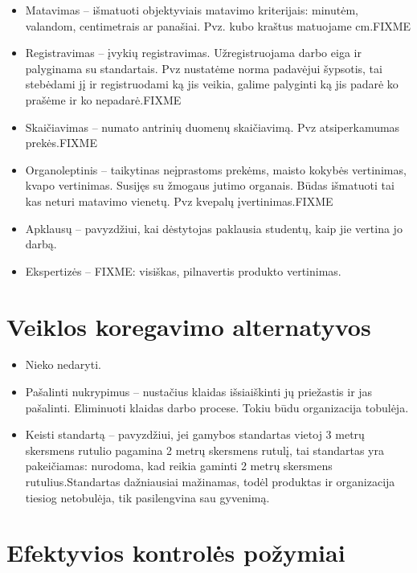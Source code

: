 \begin{itemize}
  \item Matavimas – išmatuoti objektyviais matavimo kriterijais: minutėm, valandom, centimetrais ar panašiai. Pvz. kubo kraštus matuojame cm.FIXME
  \item Registravimas – įvykių registravimas. Užregistruojama darbo eiga ir palyginama su standartais. Pvz nustatėme norma padavėjui šypsotis, tai stebėdami jį ir registruodami ką jis veikia, galime palyginti ką jis padarė ko prašėme ir ko nepadarė.FIXME
  \item Skaičiavimas –  numato antrinių duomenų skaičiavimą. Pvz atsiperkamumas prekės.FIXME
  \item Organoleptinis – taikytinas neįprastoms prekėms, maisto kokybės vertinimas, kvapo vertinimas. Susijęs su žmogaus jutimo organais. Būdas išmatuoti tai kas neturi matavimo vienetų. Pvz kvepalų įvertinimas.FIXME
  \item Apklausų – pavyzdžiui, kai dėstytojas paklausia studentų, kaip
    jie vertina jo darbą.
  \item Ekspertizės – FIXME: visiškas, pilnavertis produkto vertinimas.
\end{itemize}

\section{Veiklos koregavimo alternatyvos}

\begin{itemize}
  \item Nieko nedaryti.
  \item Pašalinti nukrypimus – nustačius klaidas išsiaiškinti jų priežastis
    ir jas pašalinti. Eliminuoti klaidas darbo procese. Tokiu būdu organizacija tobulėja. 
  \item Keisti standartą – pavyzdžiui, jei gamybos standartas vietoj
    3 metrų skersmens rutulio pagamina 2 metrų skersmens rutulį, tai
    standartas yra pakeičiamas: nurodoma, kad reikia gaminti 2 metrų
    skersmens rutulius.Standartas dažniausiai mažinamas, todėl produktas ir organizacija tiesiog netobulėja, tik pasilengvina sau gyvenimą.
\end{itemize}

\section{Efektyvios kontrolės požymiai}

